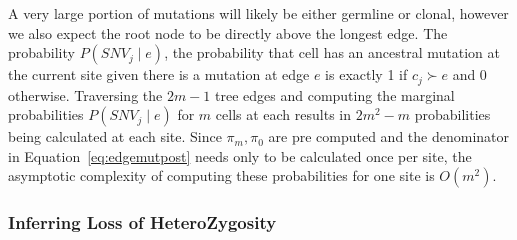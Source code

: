 \documentclass[../../main.tex]{subfiles}
\begin{document}
A very large portion of mutations will likely be either germline or clonal, however we also expect the root node to be directly above the longest edge. The probability $P(SNV_j\mid e)$, the probability that cell has an ancestral mutation at the current site given there is a mutation at edge $e$ is exactly 1 if $c_j \succ e$ and 0 otherwise. Traversing the $2m-1$ tree edges and computing the marginal probabilities $P(SNV_j\mid e)$ for $m$ cells at each results in $2m^2-m$ probabilities being calculated at each site. Since $\pi_m, \pi_0$ are pre computed and the denominator in Equation~\ref{eq:edgemutpost} needs only to be calculated once per site, the asymptotic complexity of computing these probabilities for one site is $O(m^2)$.
\subsubsection*{Inferring Loss of HeteroZygosity}
\end{document}
